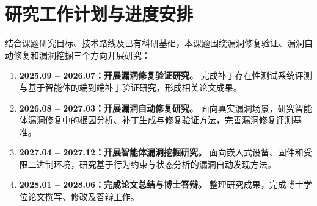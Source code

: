 \section{研究工作计划与进度安排}

结合课题研究目标、技术路线及已有科研基础，本课题围绕漏洞修复验证、漏洞自动修复和漏洞挖掘三个方向开展研究：

\begin{enumerate}

\item \textbf{2025.09 -- 2026.07：开展漏洞修复验证研究。}
完成补丁存在性测试系统评测与基于智能体的端到端补丁验证研究，形成相关论文成果。

\item \textbf{2026.08 -- 2027.03：开展漏洞自动修复研究。}
面向真实漏洞场景，研究智能体漏洞修复中的根因分析、补丁生成与修复验证方法，完善漏洞修复评测基准。

\item \textbf{2027.04 -- 2027.12：开展智能体漏洞挖掘研究。}
面向嵌入式设备、固件和受限二进制环境，研究基于行为约束与状态分析的漏洞自动发现方法。

\item \textbf{2028.01 -- 2028.06：完成论文总结与博士答辩。}
整理研究成果，完成博士学位论文撰写、修改及答辩工作。

\end{enumerate}